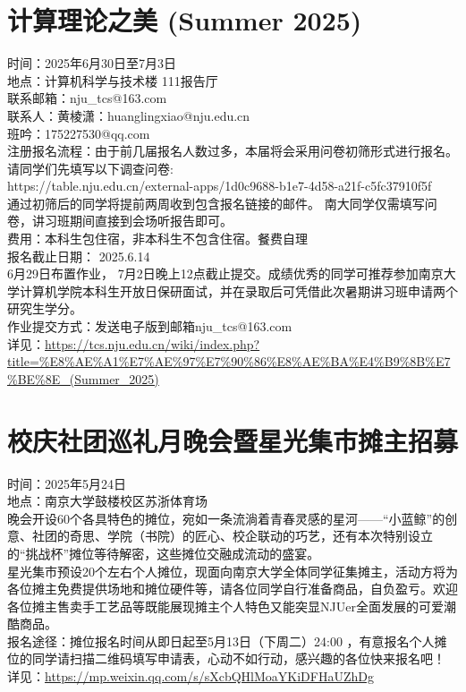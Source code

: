 \documentclass[letterpaper, 12pt]{article}
\begin{document}
\begin{multicols}{2}
\section{计算理论之美 (Summer 2025)} %
时间：2025年6月30日至7月3日
\\地点：计算机科学与技术楼 111报告厅
\\联系邮箱：nju\_tcs@163.com
\\联系人：黄棱潇：huanglingxiao@nju.edu.cn
\\班吟：175227530@qq.com
\\注册报名流程：由于前几届报名人数过多，本届将会采用问卷初筛形式进行报名。请同学们先填写以下调查问卷:
\\https://table.nju.edu.cn/external-apps/1d0c9688-b1e7-4d58-a21f-c5fc37910f5f
\\通过初筛后的同学将提前两周收到包含报名链接的邮件。 南大同学仅需填写问卷，讲习班期间直接到会场听报告即可。
\\费用：本科生包住宿，非本科生不包含住宿。餐费自理
\\报名截止日期： 2025.6.14
\\6月29日布置作业， 7月2日晚上12点截止提交。成绩优秀的同学可推荐参加南京大学计算机学院本科生开放日保研面试，并在录取后可凭借此次暑期讲习班申请两个研究生学分。
\\作业提交方式：发送电子版到邮箱nju\_tcs@163.com
\\详见：\url{https://tcs.nju.edu.cn/wiki/index.php?title=%E8%AE%A1%E7%AE%97%E7%90%86%E8%AE%BA%E4%B9%8B%E7%BE%8E_(Summer_2025)}

\section{校庆社团巡礼月晚会暨星光集市摊主招募} %
时间：2025年5月24日
\\地点：南京大学鼓楼校区苏浙体育场
\\晚会开设60个各具特色的摊位，宛如一条流淌着青春灵感的星河——“小蓝鲸”的创意、社团的奇思、学院（书院）的匠心、校企联动的巧艺，还有本次特别设立的“挑战杯”摊位等待解密，这些摊位交融成流动的盛宴。
\\星光集市预设20个左右个人摊位，现面向南京大学全体同学征集摊主，活动方将为各位摊主免费提供场地和摊位硬件等，请各位同学自行准备商品，自负盈亏。欢迎各位摊主售卖手工艺品等既能展现摊主个人特色又能突显NJUer全面发展的可爱潮酷商品。
\\报名途径：摊位报名时间从即日起至5月13日（下周二）24:00 ，有意报名个人摊位的同学请扫描二维码填写申请表，心动不如行动，感兴趣的各位快来报名吧！
\\详见：\url{https://mp.weixin.qq.com/s/sXcbQHlMoaYKiDFHaUZhDg}


\end{multicols}
\end{document}
